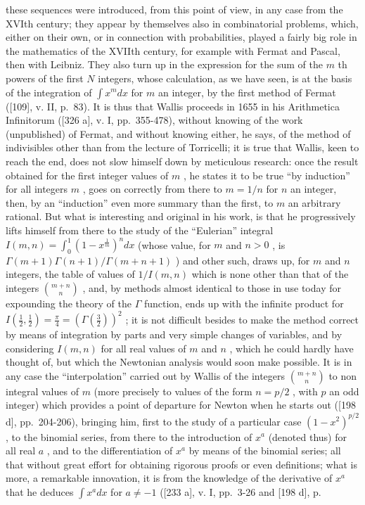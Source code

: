these sequences were introduced, from this point of view, in any case from the XVIth century; they appear by themselves also in combinatorial problems, which, either on their own, or in connection with probabilities, played a fairly big role in the mathematics of the XVIIth century, for example with Fermat and Pascal, then with Leibniz. They also turn up in the expression for the sum of the \(m\) th powers of the first \(N\) integers, whose calculation, as we have seen, is at the basis of the integration of \(\int x^{m}dx\) for \(m\) an integer, by the first method of Fermat ({[}109{]}, v. II, p.~83). It is thus that Wallis proceeds in 1655 in his Arithmetica Infinitorum ({[}326 a{]}, v. I, pp.~355-478), without knowing of the work (unpublished) of Fermat, and without knowing either, he says, of the method of indivisibles other than from the lecture of Torricelli; it is true that Wallis, keen to reach the end, does not slow himself down by meticulous research: once the result obtained for the first integer values of \(m\) , he states it to be true ``by induction'' for all integers \(m\) , goes on correctly from there to \(m = 1/n\) for \(n\) an integer, then, by an ``induction'' even more summary than the first, to \(m\) an arbitrary rational. But what is interesting and original in his work, is that he progressively lifts himself from there to the study of the ``Eulerian'' integral \(I(m,n) = \int_{0}^{1}(1 - x^{\frac{1}{m}})^{n}dx\) (whose value, for \(m\) and \(n > 0\) , is \(\Gamma(m+1)\Gamma(n+1)/\Gamma(m+n+1)\) ) and other such, draws up, for \(m\) and \(n\) integers, the table of values of \(1/I(m,n)\) which is none other than that of the integers \(\binom{m+n}{n}\) , and, by methods almost identical to those in use today for expounding the theory of the \(\Gamma\) function, ends up with the infinite product for \(I\left(\frac{1}{2},\frac{1}{2}\right)=\frac{\pi}{4}=\left(\Gamma\left(\frac{3}{2}\right)\right)^{2}\) ; it is not difficult besides to make the method correct by means of integration by parts and very simple changes of variables, and by considering \(I(m,n)\) for all real values of \(m\) and \(n\) , which he could hardly have thought of, but which the Newtonian analysis would soon make possible. It is in any case the ``interpolation'' carried out by Wallis of the integers \(\binom{m+n}{n}\) to non integral values of \(m\) (more precisely to values of the form \(n=p/2\) , with \(p\) an odd integer) which provides a point of departure for Newton when he starts out ({[}198 d{]}, pp.~204-206), bringing him, first to the study of a particular case \((1-x^{2})^{p/2}\) , to the binomial series, from there to the introduction of \(x^{a}\) (denoted thus) for all real \(a\) , and to the differentiation of \(x^{a}\) by means of the binomial series; all that without great effort for obtaining rigorous proofs or even definitions; what is more, a remarkable innovation, it is from the knowledge of the derivative of \(x^{a}\) that he deduces \(\int x^{a}dx\) for \(a \neq -1\) ({[}233 a{]}, v. I, pp.~3-26 and {[}198 d{]}, p.

